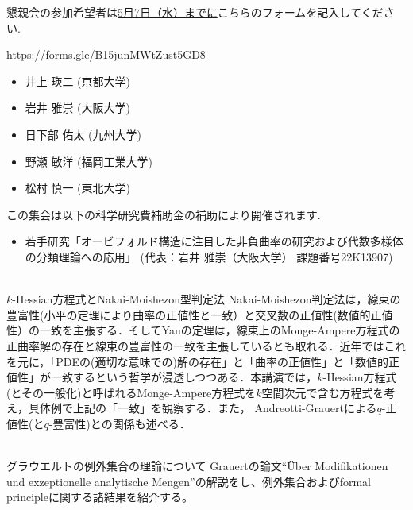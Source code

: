 \documentclass[dvipdfmx,a4paper,12pt]{article}
\theoremstyle{plain} %
\theoremstyle{definition} %
\begin{document}
懇親会の参加希望者は\underline{5月7日（水）までに}こちらのフォームを記入してください.
\begin{center}
  \url{https://forms.gle/B15junMWtZust5GD8}
  \end{center}

\vskip5mm
  
\begin{itemize}
  \setlength{\parskip}{0cm} 
  \setlength{\itemsep}{0cm}
\item 井上 瑛二 (京都大学)
\item 岩井 雅崇 (大阪大学)
\item 日下部 佑太 (九州大学)
\item 野瀬 敏洋 (福岡工業大学)
\item 松村 慎一 (東北大学)
  \end{itemize}

\vskip5mm


この集会は以下の科学研究費補助金の補助により開催されます.
\begin{itemize}
  \setlength{\parskip}{0cm} 
  \setlength{\itemsep}{0cm}
\item 若手研究「オービフォルド構造に注目した非負曲率の研究および代数多様体の分類理論への応用」
 (代表：岩井 雅崇（大阪大学） 課題番号22K13907)
  \end{itemize}



\newpage

\vskip5mm

\vskip5mm
\\
$k$-Hessian方程式とNakai-Moishezon型判定法
\vskip3mm
Nakai-Moishezon判定法は，線束の豊富性(小平の定理により曲率の正値性と一致）と交叉数の正値性(数値的正値性）の一致を主張する．そしてYauの定理は，線束上のMonge-Ampere方程式の正曲率解の存在と線束の豊富性の一致を主張しているとも取れる．近年ではこれを元に，「PDEの(適切な意味での)解の存在」と「曲率の正値性」と「数値的正値性」が一致するという哲学が浸透しつつある．本講演では，$k$-Hessian方程式(とその一般化)と呼ばれるMonge-Ampere方程式を$k$空間次元で含む方程式を考え，具体例で上記の「一致」を観察する．また， Andreotti-Grauertによる$q$-正値性(と$q$-豊富性)との関係も述べる．
\vskip8mm

\\
グラウエルトの例外集合の理論について 
\vskip3mm
Grauertの論文``\"Uber Modifikationen und exzeptionelle analytische Mengen''の解説をし、例外集合およびformal principleに関する諸結果を紹介する。 
\vskip8mm
\end{document}
